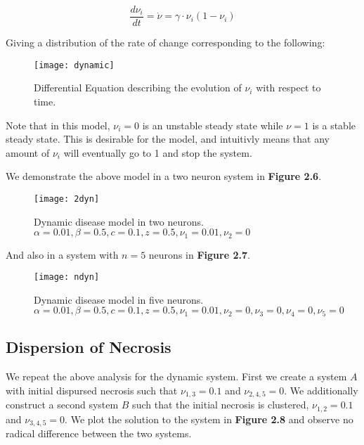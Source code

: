 \documentclass[11pt]{report}
\begin{document}
$$ \frac{d \nu_i}{dt} = \dot{\nu} = \gamma \cdot \nu_i (1 - \nu_i) $$

Giving a distribution of the rate of change corresponding to the following:

\begin{figure}[!ht]
  \caption{Differential Equation describing the evolution of $\nu_i$ with respect to time. }
  \centering
    \texttt{[image: dynamic]}
\end{figure}


Note that in this model, $\nu_i=0$ is an unstable steady state while $\nu=1$ is a stable steady state. This is desirable for the model, and intuitivly means that any amount of $\nu_i$ will eventually go to 1 and stop the system. 

We demonstrate the above model in a two neuron system in \textbf{Figure 2.6}.

\begin{figure}[!ht]
  \caption{Dynamic disease model in two neurons. $\alpha = 0.01, \beta = 0.5,c = 0.1,z = 0.5, \nu_1 = 0.01, \nu_2 = 0$ }
  \centering
    \texttt{[image: 2dyn]}
\end{figure}


And also in a system with $n=5$ neurons in \textbf{Figure 2.7}.

\begin{figure}[!ht]
  \caption{Dynamic disease model in five neurons. $\alpha = 0.01, \beta = 0.5,c = 0.1,z = 0.5, \nu_1 = 0.01, \nu_2 = 0, \nu_3 = 0, \nu_4 = 0, \nu_5 = 0$ }
  \centering
    \texttt{[image: ndyn]}
\end{figure}

\subsection{Dispersion of Necrosis} %
\label{sub:dispersion_of_necrosis}

We repeat the above analysis for the dynamic system. First we create a system $A$ with initial dispursed necrosis such that $\nu_{1,3} = 0.1$ and $\nu_{2,4,5} = 0$. We additionally construct a second system $B$ such that the initial necrosis is clustered, $\nu_{1,2} = 0.1$ and $\nu_{3,4,5} = 0$. We plot the solution to the system in \textbf{Figure 2.8} and observe no radical difference between the two systems.
\end{document}
